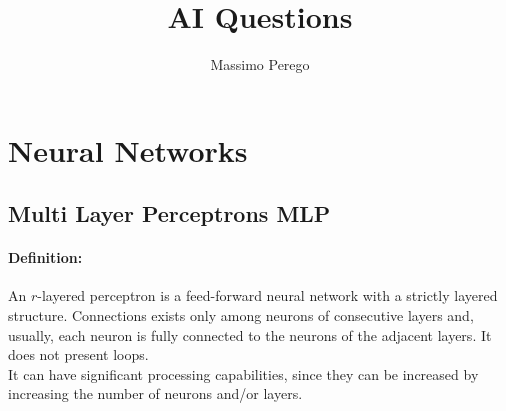 \documentclass{article}
\begin{document}
	
	\title{AI Questions}
	\author{Massimo Perego}
	\date{}
	\maketitle
	
	\tableofcontents
	
	\newpage
	
	\section{Neural Networks}
	
	\subsection{Multi Layer Perceptrons MLP}
	
	\paragraph{Definition:} An $r$-layered perceptron is a feed-forward neural network with a strictly layered structure. Connections exists only among neurons of consecutive layers and, usually, each neuron is fully connected to the neurons of the adjacent layers. It does not present loops.\\
	It can have significant processing capabilities, since they can be increased by increasing the number of neurons and/or layers.\\
	
	
	
	
	
	
\end{document}
